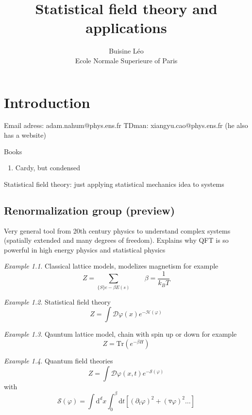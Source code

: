\documentclass[a4paper]{book}
\theoremstyle{definition}
\theoremstyle{remark}
\newtheorem*{example}{Example}
\begin{document}
\title{Statistical field theory and applications}
\author{Buisine Léo\\Ecole Normale Superieure of Paris}
\maketitle

\tableofcontents

\chapter{Introduction}
Email adress: adam.nahum@phys.ens.fr \newline 
TDman: xiangyu.cao@phys.ens.fr (he also has a website) \par  \bigskip 

Books 
\begin{enumerate}
    \item Cardy, but condensed
\end{enumerate} \bigskip

Statistical field theory: just applying statistical mechanics idea to systems 

\section{Renormalization group (preview)}

Very general tool from 20th century physics to understand complex systems (spatially extended and many degrees of freedom). Explains why QFT is so powerful in high energy physics and statistical physics 

\begin{example}
    Classical lattice models, modelizes magnetism for example
    \begin{equation}
        Z = \sum_{\{S\}e-\beta E(s)} \qquad \beta = \frac{1}{k_B T}
    \end{equation}
\end{example}
\begin{example}
    Statistical field theory
    \begin{equation}
        Z = \int \mathcal{D}\varphi(x) e^{-\mathcal{H}(\varphi)}
    \end{equation}
\end{example}
\begin{example}
    Qauntum lattice model, chain with spin up or down for example 
    \begin{equation}
        Z = \text{Tr}(e^{-\beta H})
    \end{equation}
\end{example}
\begin{example}
    Quantum field theories
    \begin{equation}
        Z = \int \mathcal{D}\varphi(x, t)e^{-\mathcal{S}(\varphi)}
    \end{equation}
    with 
    \begin{equation}
        \mathcal{S}(\varphi) = \int \text{d}^d x \int^\beta_0 \text{d}t [(\partial_t\varphi)^2 + (\triangledown  \varphi)^2\dots ]
    \end{equation}
\end{example}
\end{document}
